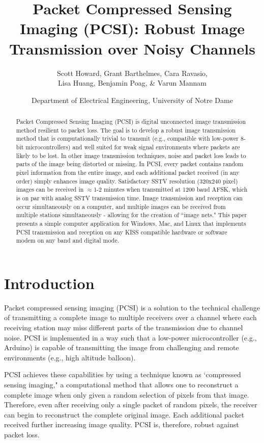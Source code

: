 \documentclass[letterpaper]{article}
\title{Packet Compressed Sensing Imaging (PCSI): Robust Image Transmission over Noisy Channels
\footnotetext{\doclicenseThis Presented at ARRL/TAPR DCC 2020}}%
\author{Scott Howard, Grant Barthelmes, Cara Ravasio,\\ Lisa Huang, Benjamin Poag, \& Varun Mannam}
\date{Department of Electrical Engineering, University of Notre Dame}
\begin{document}
\maketitle

\begin{abstract}
Packet Compressed Sensing Imaging (PCSI) is digital unconnected image transmission method resilient to packet loss. The goal is to develop a robust image transmission method that is computationally trivial to transmit (e.g., compatible with low-power 8-bit microcontrollers) and well suited for weak signal environments where packets are likely to be lost. In other image transmission techniques, noise and packet loss leads to parts of the image being distorted or missing. In PCSI, every packet contains random pixel information from the entire image, and each additional packet received (in any order) simply enhances image quality. Satisfactory SSTV resolution (320x240 pixel) images can be received in $\approx$1-2 minutes when transmitted at 1200 baud AFSK, which is on par with analog SSTV transmission time. Image transmission and reception can occur simultaneously on a computer, and multiple images can be received from multiple stations simultaneously - allowing for the creation of ``image nets." This paper presents a simple computer application for Windows, Mac, and Linux that implements PCSI transmission and reception on any KISS compatible hardware or software modem on any band and digital mode.
\end{abstract}

\tableofcontents


\section{Introduction}
Packet compressed sensing imaging (PCSI) is a solution to the technical challenge of transmitting a complete image to multiple receivers over a channel where each receiving station may miss different parts of the transmission due to channel noise. PCSI is implemented in a way such that a low-power microcontroller (e.g., Arduino) is capable of transmitting the image from challenging and  remote environments (e.g., high altitude balloon).

PCSI achieves these capabilities by using a technique known as `compressed sensing imaging," a computational method that allows one to reconstruct a complete image when only given a random selection of pixels from that image. Therefore, even after receiving only a single packet of random pixels, the receiver can begin to reconstruct the complete original image. Each additional packet received further increasing image quality. PCSI is, therefore, robust against packet loss. 
\end{document}
